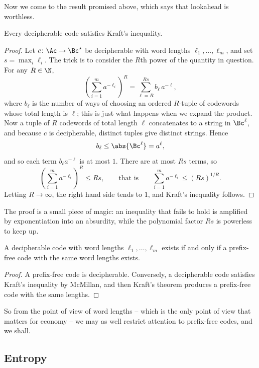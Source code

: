 Now we come to the result promised above, which says that lookahead is worthless.

\begin{theorem}[McMillan]
	Every decipherable code satisfies Kraft's inequality.
\end{theorem}

\begin{proof}
	Let $c \colon \Ac \to \Bc^\star$ be decipherable with word lengths $\ell_1, \dots, \ell_m$, and set $s = \max_i \ell_i$. The trick is to consider the $R$th power of the quantity in question. For any $R \in \N$,
	$$\left(\sum_{i=1}^m a^{-\ell_i}\right)^{\!R} = \sum_{\ell=R}^{Rs} b_\ell\, a^{-\ell},$$
	where $b_\ell$ is the number of ways of choosing an ordered $R$-tuple of codewords whose total length is $\ell$; this is just what happens when we expand the product. Now a tuple of $R$ codewords of total length $\ell$ concatenates to a string in $\Bc^\ell$, and because $c$ is decipherable, distinct tuples give distinct strings. Hence
	$$b_\ell \le \abs{\Bc^\ell} = a^\ell,$$
	and so each term $b_\ell a^{-\ell}$ is at most $1$. There are at most $Rs$ terms, so
	$$\left(\sum_{i=1}^m a^{-\ell_i}\right)^{\!R} \le Rs, \qquad \text{that is} \qquad \sum_{i=1}^m a^{-\ell_i} \le (Rs)^{1/R}.$$
	Letting $R \to \infty$, the right hand side tends to $1$, and Kraft's inequality follows.
\end{proof}

The proof is a small piece of magic: an inequality that fails to hold is amplified by exponentiation into an absurdity, while the polynomial factor $Rs$ is powerless to keep up.

\begin{corollary}
	A decipherable code with word lengths $\ell_1, \dots, \ell_m$ exists if and only if a prefix-free code with the same word lengths exists.
\end{corollary}

\begin{proof}
	A prefix-free code is decipherable. Conversely, a decipherable code satisfies Kraft's inequality by McMillan, and then Kraft's theorem produces a prefix-free code with the same lengths.
\end{proof}

So from the point of view of word lengths -- which is the only point of view that matters for economy -- we may as well restrict attention to prefix-free codes, and we shall.

\subsection{Entropy}

